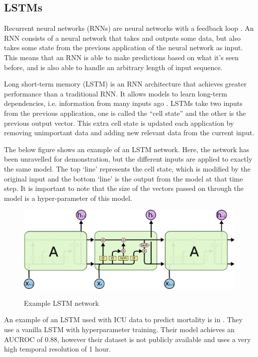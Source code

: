 \documentclass[12pt]{article}
\begin{document}
\subsection{LSTMs}
Recurrent neural networks (RNNs) are neural networks with a feedback loop \cite{ColahLSTM}. An RNN consists of a neural network that takes and outputs some data, but also takes some state from the previous application of the neural network as input. This means that an RNN is able to make predictions based on what it's seen before, and is also able to handle an arbitrary length of input sequence.

Long short-term memory (LSTM) is an RNN architecture that achieves greater performance than a traditional RNN. It allows models to learn long-term dependencies, i.e. information from many inputs ago \cite{ColahLSTM}. LSTMs take two inputs from the previous application, one is called the ``cell state'' and the other is the previous output vector. This extra cell state is updated each application by removing unimportant data and adding new relevant data from the current input. 

The below figure shows an example of an LSTM network. Here, the network has been unravelled for demonstration, but the different inputs are applied to exactly the same  model. The top `line' represents the cell state, which is modified by the original input and the bottom `line' is the output from the model at that time step. It is important to note that the size of the vectors passed on through the model is a hyper-parameter of this model.

\begin{figure}[H]
\centering\caption{Example LSTM network \cite{ColahLSTM}}
\includegraphics[scale=0.5]{LSTM3-chain.png}
\label{Example LSTM}
\end{figure}

An example of an LSTM used with ICU data to predict mortality is in \cite{ICUFancyLSTM}. They use a vanilla LSTM with hyperparameter training. Their model achieves an AUCROC of 0.88, however their dataset is not publicly available and uses a very high temporal resolution of 1 hour.
\end{document}
